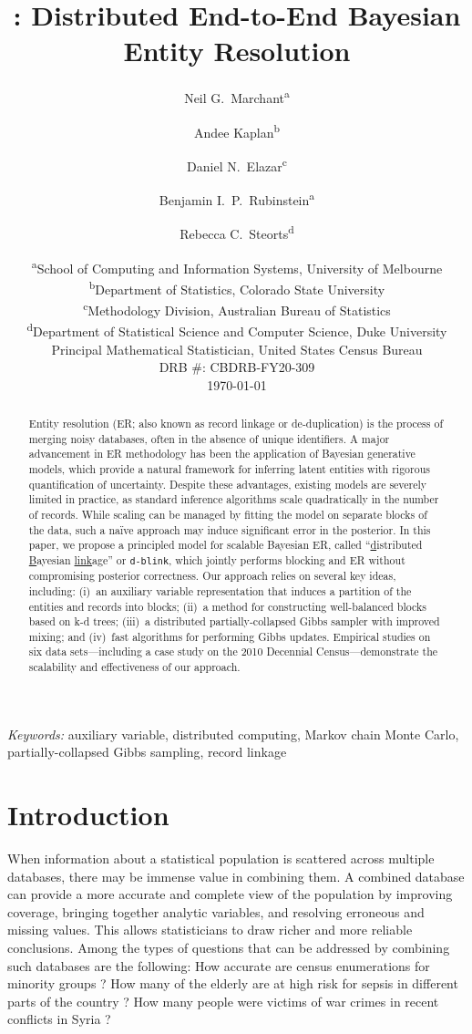 \documentclass[12pt,letterpaper]{article}
\title{\bf \dblink: Distributed End-to-End Bayesian Entity Resolution}
\author{Neil G.~Marchant\textsuperscript{a} \and
  Andee Kaplan\textsuperscript{b} \and 
  Daniel N.~Elazar\textsuperscript{c} \and
  Benjamin I.~P.~Rubinstein\textsuperscript{a} \and 
  Rebecca C.~Steorts\textsuperscript{d}}
\date{
  \textsuperscript{a}School of Computing and Information Systems, University 
  of Melbourne\\
  \textsuperscript{b}Department of Statistics, Colorado State University\\
  \textsuperscript{c}Methodology Division, Australian Bureau of Statistics\\
  \textsuperscript{d}Department of Statistical Science and Computer Science, Duke University\\Principal Mathematical Statistician, United States Census Bureau\\
  DRB \#: CBDRB-FY20-309\\[2ex]
  \today}
\newcommand{\1}[1]{\mathbb{I}\!\left[#1\right]} %
\newcommand{\dblink}{\texttt{\upshape \lowercase{d-blink}}} %
\def\spacingset#1{\renewcommand{\baselinestretch}%
  {#1}\small\normalsize} \spacingset{1}
\begin{document}
\maketitle

\bigskip
\begin{abstract}
Entity resolution (ER; also known as record linkage or de-duplication) is 
the process of merging noisy databases, often in the absence of unique 
identifiers. 
A major advancement in ER methodology has been the application of Bayesian 
generative models, which provide a natural framework for inferring latent 
entities with rigorous quantification of uncertainty. 
Despite these advantages, existing models are severely limited in practice, 
as standard inference algorithms scale quadratically in the number of records. 
While scaling can be managed by fitting the model on separate blocks of 
the data, such a na\"{i}ve approach may induce significant error 
in the posterior. 
In this paper, we propose a principled model for scalable Bayesian ER, 
called ``\underline{d}istributed \underline{B}ayesian 
\underline{link}age'' or \dblink, which jointly performs 
blocking and ER without compromising posterior correctness. 
Our approach relies on several key ideas, including: 
(i)~an auxiliary variable representation that induces a partition of 
the entities and records into blocks; 
(ii)~a method for constructing well-balanced blocks based on k-d trees; 
(iii)~a distributed partially-collapsed Gibbs sampler with improved mixing; 
and 
(iv)~fast algorithms for performing Gibbs updates. 
Empirical studies on six data sets---including a case study 
on the 2010 Decennial Census---demonstrate the scalability and 
effectiveness of our approach.
\end{abstract}


\noindent%
{\it Keywords:} auxiliary variable, distributed computing, Markov chain Monte 
Carlo, partially-collapsed Gibbs sampling, record linkage

\newpage
\spacingset{1.5}

\section{Introduction}
\label{sec:introduction}

﻿When information about a statistical population is scattered across 
multiple databases, there may be immense value in combining them. 
A combined database can provide a more accurate and complete view of 
the population by improving coverage, bringing together analytic 
variables, and resolving erroneous and missing values. 
This allows statisticians to draw  richer and more reliable 
conclusions.  
Among the types of questions that can be addressed by combining such 
databases are the following: 
How accurate are census enumerations for minority groups 
\citep{winkler_overview_2006}? 
How many of the elderly are at high risk for sepsis in different parts 
of the country \citep{saria_trillion_2014}? 
How many people were victims of war crimes in recent conflicts in Syria 
\citep{price_2013}? 
\end{document}
